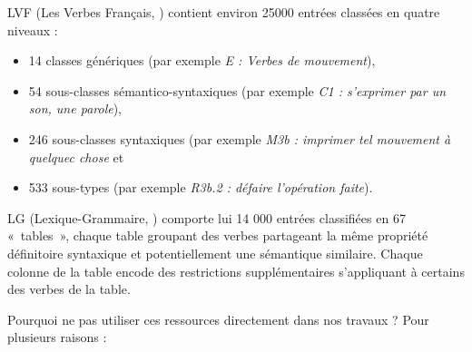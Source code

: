 LVF (Les Verbes Français, \cite{dubois1997verbes}) contient environ 25000
entrées classées en quatre niveaux :

\begin{itemize}

    \item 14 classes génériques (par exemple \emph{E : Verbes de mouvement}),

    \item 54 sous-classes sémantico-syntaxiques (par exemple \emph{C1 :
        s'exprimer par un son, une parole}),

    \item 246 sous-classes syntaxiques (par exemple \emph{M3b : imprimer tel
        mouvement à quelquec chose} et

    \item 533 sous-types (par exemple \emph{R3b.2 : défaire l'opération
        faite}).

\end{itemize}


LG (Lexique-Grammaire, \cite{gross1975methodes,boons1976structure}) comporte
lui 14 000 entrées classifiées en 67 «~tables~», chaque table groupant des
verbes partageant la même propriété définitoire syntaxique et potentiellement
une sémantique similaire. Chaque colonne de la table encode des restrictions
supplémentaires s'appliquant à certains des verbes de la table.


Pourquoi ne pas utiliser ces ressources directement dans nos travaux ? Pour
plusieurs raisons :

